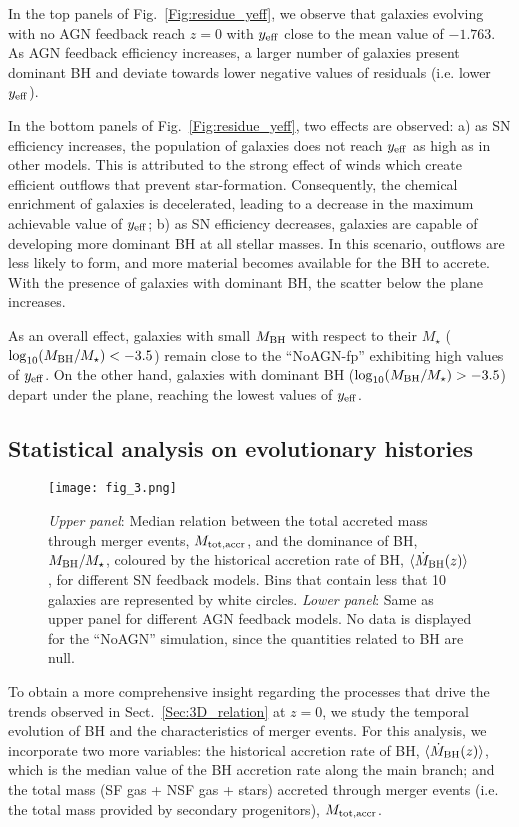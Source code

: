 \documentclass[baaa]{baaa}
\begin{document}
In the top panels of Fig.~\ref{Fig:residue_yeff}, we observe that galaxies evolving with no AGN feedback reach $z=0$ with $y_{\rm eff}$ close to the mean value of $-1.763$. As AGN feedback efficiency increases, a larger number of galaxies present dominant BH and deviate towards lower negative values of residuals (i.e. lower $y_{\rm eff}$). 

In the bottom panels of Fig.~\ref{Fig:residue_yeff}, two effects are observed: a) as SN efficiency increases, the population of galaxies does not reach $y_{\rm eff}$ as high as in other models. This is attributed to the strong effect of winds which create efficient outflows that prevent star-formation. Consequently, the chemical enrichment of galaxies is decelerated, leading to a decrease in the maximum achievable value of $y_{\rm eff}$; b) as SN efficiency decreases, galaxies are capable of developing more dominant BH at all stellar masses. In this scenario, outflows are less likely to form, and more material becomes available for the BH to accrete. With the presence of galaxies with dominant BH, the scatter below the plane increases.

As an overall effect, galaxies with small $M_{\rm BH}$ with respect to their $M_\star$ ($\log_{10}(M_{\rm BH}/M_\star)<-3.5$) remain close to the ``NoAGN-fp'' exhibiting high values of $y_{\rm eff}$. On the other hand, galaxies with dominant BH ($\log_{10}(M_{\rm BH}/M_\star)>-3.5$) depart under the plane, reaching the lowest values of $y_{\rm eff}$.

\subsection{Statistical analysis on evolutionary histories}
\begin{figure}[!t]
\centering
\texttt{[image: fig\_3.png]}
\caption{{\em Upper panel}: Median relation between the total accreted mass through merger events, $M_{\rm tot, accr}$, and the dominance of BH, $M_{\rm BH}/M_\star$, coloured by the historical accretion rate of BH, $\langle \Dot{M}_{\rm BH}(z) \rangle$, for different SN feedback models. Bins that contain less that 10 galaxies are represented by white circles. {\em Lower panel}: Same as upper panel for different AGN feedback models. No data is displayed for the ``NoAGN'' simulation, since the quantities related to BH are null.}
\label{Fig:evol_histories}
\end{figure}

To obtain a more comprehensive insight regarding the processes that drive the trends observed in Sect.~\ref{Sec:3D_relation} at $z=0$, we study the temporal evolution of BH and the characteristics of merger events. For this analysis, we incorporate two more variables: the historical accretion rate of BH, $\langle \Dot{M}_{\rm BH}(z) \rangle$, which is the median value of the BH accretion rate along the main branch; and the total mass (SF gas + NSF gas + stars) accreted through merger events (i.e. the total mass provided by secondary progenitors), $M_{\rm tot, accr}$.
\end{document}
